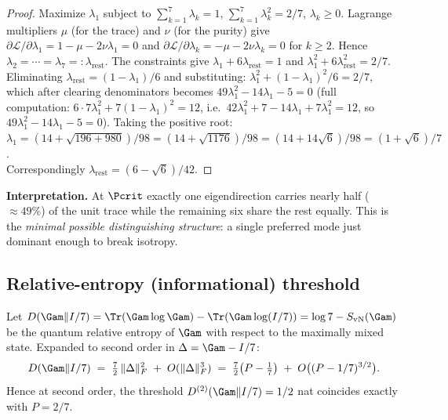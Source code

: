 \begin{proof}
Maximize $\lambda_1$ subject to $\sum_{k=1}^{7}\lambda_k = 1$,
$\sum_{k=1}^{7}\lambda_k^2 = 2/7$, $\lambda_k \geq 0$. Lagrange multipliers
$\mu$ (for the trace) and $\nu$ (for the purity) give
$\partial\mathcal{L}/\partial\lambda_1 = 1 - \mu - 2\nu\lambda_1 = 0$ and
$\partial\mathcal{L}/\partial\lambda_k = -\mu - 2\nu\lambda_k = 0$ for $k \geq 2$.
Hence $\lambda_2 = \cdots = \lambda_7 =: \lambda_{\mathrm{rest}}$.
The constraints give
$\lambda_1 + 6\lambda_{\mathrm{rest}} = 1$ and
$\lambda_1^2 + 6\lambda_{\mathrm{rest}}^2 = 2/7$.
Eliminating $\lambda_{\mathrm{rest}} = (1-\lambda_1)/6$ and substituting:
$\lambda_1^2 + (1-\lambda_1)^2/6 = 2/7$,
which after clearing denominators becomes
$49\lambda_1^2 - 14\lambda_1 - 5 = 0$
(full computation: $6\cdot 7\lambda_1^2 + 7(1-\lambda_1)^2 = 12$, i.e.\ $42\lambda_1^2 + 7 - 14\lambda_1 + 7\lambda_1^2 = 12$, so $49\lambda_1^2 - 14\lambda_1 - 5 = 0$).
Taking the positive root:
$\lambda_1 = (14 + \sqrt{196 + 980})/98 = (14 + \sqrt{1176})/98 = (14 + 14\sqrt{6})/98 = (1+\sqrt 6)/7$. \\
Correspondingly $\lambda_{\mathrm{rest}} = (6 - \sqrt 6)/42$.
\end{proof}

\textbf{Interpretation.} At $\Pcrit$ exactly one eigendirection carries nearly half
($\approx 49\%$) of the unit trace while the remaining six share the rest
equally. This is the \emph{minimal possible distinguishing structure}:
a single preferred mode just dominant enough to break isotropy.

\subsection{Relative-entropy (informational) threshold}
\label{app:pcrit-kl}

\begin{theorembox}
Let $D(\Gam \| I/7) = \Tr(\Gam \log\Gam) - \Tr(\Gam\log(I/7))
= \log 7 - S_{\mathrm{vN}}(\Gam)$ be the quantum relative entropy of
$\Gam$ with respect to the maximally mixed state.
Expanded to second order in $\Delta = \Gam - I/7$:
\[
  D(\Gam \| I/7) \;=\; \tfrac{7}{2}\,\|\Delta\|_F^2 \;+\; O(\|\Delta\|_F^3)
  \;=\; \tfrac{7}{2}\bigl(P - \tfrac{1}{7}\bigr) \;+\; O\bigl((P-1/7)^{3/2}\bigr).
\]
Hence at second order, the threshold $D^{(2)}(\Gam\|I/7) = 1/2$ nat
coincides exactly with $P = 2/7$.
\end{theorembox}

